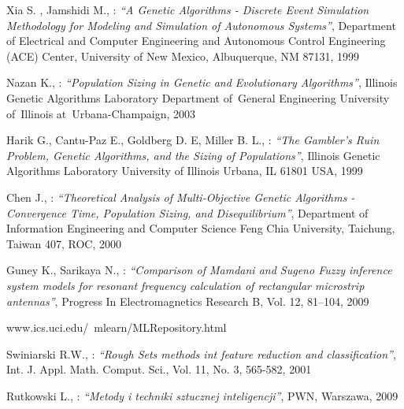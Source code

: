 \begin{thebibliography}{99}
	Xia S. , Jamshidi M., : \textit{``A Genetic Algorithms - Discrete Event Simulation
	Methodology for Modeling and Simulation of Autonomous Systems''},
	Department of Electrical and Computer Engineering and Autonomous Control Engineering
	(ACE) Center, University of New Mexico, Albuquerque, NM 87131, 1999

	Nazan K., : \textit{``Population Sizing in Genetic and Evolutionary Algorithms''},
	Illinois Genetic Algorithms Laboratory Department of~General Engineering University 
	of~Illinois at~Urbana-Champaign, 2003

	Harik G., Cantu-Paz E., Goldberg D. E, Miller B. L., : \textit{``The Gambler’s Ruin Problem, Genetic Algorithms, and the Sizing of Populations''}, 
	Illinois Genetic Algorithms Laboratory University of Illinois Urbana, IL
	61801 USA, 1999

	Chen J., : \textit{``Theoretical Analysis of Multi-Objective Genetic
	Algorithms - Convergence Time, Population Sizing, and Disequilibrium''}, 
	Department of Information Engineering and Computer Science Feng Chia University,
	Taichung, Taiwan 407, ROC, 2000

	Guney K., Sarikaya N., : \textit{``Comparison of Mamdani and Sugeno Fuzzy
    inference system models for resonant frequency calculation of rectangular
    microstrip antennas''}, Progress In Electromagnetics Research B, Vol. 12,
    81–104, 2009

    www.ics.uci.edu/~mlearn/MLRepository.html

	Swiniarski R.W., : \textit{``Rough Sets methods int feature reduction and
    classification''}, Int. J. Appl. Math. Comput. Sci., Vol. 11, No. 3,
    565-582, 2001

	Rutkowski L., : \textit{``Metody i techniki sztucznej inteligencji''}, PWN,
    Warszawa, 2009

\end{thebibliography}
\newpage
\listoffigures
\listoftables

